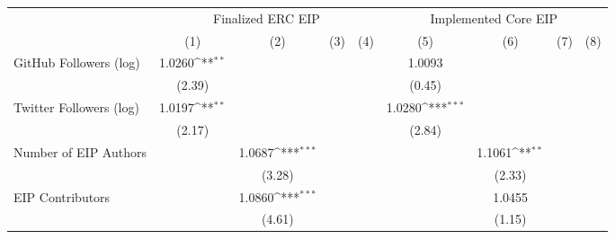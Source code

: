 {
\def\sym#1{\ifmmode^{#1}\else\(^{#1}\)\fi}
\begin{tabular}{l*{8}{c}}
\hline\hline
                                   &\multicolumn{4}{c}{Finalized ERC EIP}                                                  &\multicolumn{4}{c}{Implemented Core EIP}                                               \\\cmidrule(lr){2-5}\cmidrule(lr){6-9}
                                   &\multicolumn{1}{c}{(1)}         &\multicolumn{1}{c}{(2)}         &\multicolumn{1}{c}{(3)}         &\multicolumn{1}{c}{(4)}         &\multicolumn{1}{c}{(5)}         &\multicolumn{1}{c}{(6)}         &\multicolumn{1}{c}{(7)}         &\multicolumn{1}{c}{(8)}         \\
\hline
GitHub Followers (log)             &      1.0260\sym{**} &                     &                     &                     &      1.0093         &                     &                     &                     \\
                                   &      (2.39)         &                     &                     &                     &      (0.45)         &                     &                     &                     \\
[1em]
Twitter Followers (log)            &      1.0197\sym{**} &                     &                     &                     &      1.0280\sym{***}&                     &                     &                     \\
                                   &      (2.17)         &                     &                     &                     &      (2.84)         &                     &                     &                     \\
[1em]
Number of EIP Authors              &                     &      1.0687\sym{***}&                     &                     &                     &      1.1061\sym{**} &                     &                     \\
                                   &                     &      (3.28)         &                     &                     &                     &      (2.33)         &                     &                     \\
[1em]
EIP Contributors                   &                     &      1.0860\sym{***}&                     &                     &                     &      1.0455         &                     &                     \\
                                   &                     &      (4.61)         &                     &                     &                     &      (1.15)         &                     &                     \\

\end{tabular}}

